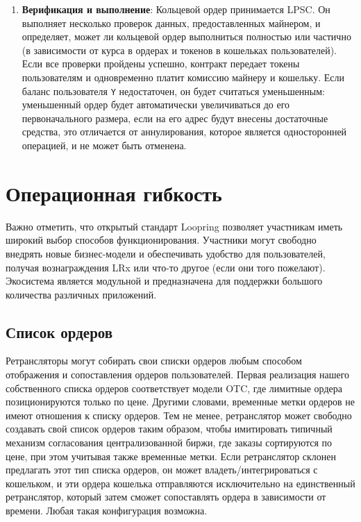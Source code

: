 \documentclass[utf8,nofonts]{article}
\makeatletter
\newenvironment{figurehere}
 {\def\@captype{figure}}
 {}
\makeatother
\begin{document}
\begin{multicols}{2}
\begin{enumerate}
		\item \textbf{Верификация и выполнение}: Кольцевой ордер принимается LPSC. Он выполняет несколько проверок данных, предоставленных майнером, и определяет, может ли кольцевой ордер выполниться полностью или частично (в зависимости от курса в ордерах и токенов в кошельках пользователей). Если все проверки пройдены успешно, контракт передает токены пользователям и одновременно платит комиссию майнеру и кошельку. Если баланс пользователя \verb|Y| недостаточен, он будет считаться уменьшенным: уменьшенный ордер будет автоматически увеличиваться до его первоначального размера, если на его адрес будут внесены достаточные средства, это отличается от аннулирования, которое является односторонней  операцией, и не может быть отменена.
		
		
	\end{enumerate}
	
	
	
	
	
	
	\section{Операционная гибкость\label{sec:business_model}}
	Важно отметить, что открытый стандарт Loopring позволяет участникам иметь широкий выбор способов функционирования. Участники могут свободно внедрять новые бизнес-модели и обеспечивать удобство для пользователей, получая вознаграждения LRx или что-то другое (если они того пожелают). Экосистема является модульной и предназначена для поддержки большого количества различных приложений.
	
	
	\subsection{Список ордеров\label{sec:order_book}}
	Ретрансляторы могут собирать свои списки ордеров любым способом отображения и сопоставления ордеров пользователей. Первая реализация нашего собственного списка ордеров соответствует модели OTC, где лимитные ордера позиционируются только по цене. Другими словами, временные метки ордеров не имеют отношения к списку ордеров. Тем не менее, ретранслятор может свободно создавать свой список ордеров таким образом, чтобы имитировать типичный механизм согласования централизованной биржи, где заказы сортируются по цене, при этом учитывая также временные метки. Если ретранслятор склонен предлагать этот тип списка ордеров, он может владеть/интегрироваться с кошельком, и эти ордера кошелька отправляются исключительно на единственный ретранслятор, который затем сможет сопоставлять ордера в зависимости от времени. Любая такая конфигурация возможна.
	

\end{multicols}
\end{document}
